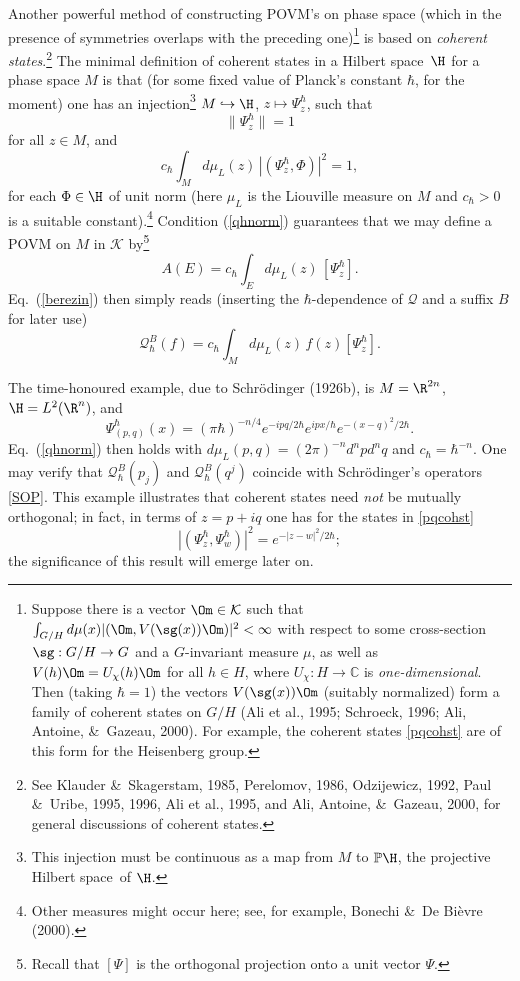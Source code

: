 \documentclass[12pt,titlepage]{article}
\newcommand{\beq}{\begin{equation}}
\newcommand{\eeq}{\end{equation}}
\newcommand{\Hs}{Hilbert space} \newcommand{\Bs}{Banach space}
\newcommand{\raw}{\rightarrow} \newcommand{\rat}{\mapsto}
\newcommand{\hraw}{\hookrightarrow} \newcommand{\Law}{\Leftarrow}
\newcommand{\qh}{q_{\hbar}} \newcommand{\sgh}{\sigma_{\hbar}}
\newcommand{\er}{\eqref}
\newcommand{\ch}{\chi} \newcommand{\ps}{\psi} \newcommand{\Ps}{\Psi}
\newcommand{\CK}{{\mathcal K}}   \newcommand{\CL}{{\mathcal L}}
\newcommand{\CQ}{{\mathcal Q}} \newcommand{\CR}{{\mathcal R}}
\renewcommand{\C}{{\mathbb C}} \newcommand{\D}{{\mathbb D}}
\renewcommand{\qh}{\CQ_{\hbar}}
\begin{document}
Another powerful method of constructing POVM's on phase space (which in the presence of symmetries overlaps with the preceding one)\footnote{
Suppose there is a vector $\Om\in\CK$ such that
$\int_{G/H}d\mu(x) |(\Om, V(\sg(x))\Om)|^2 <\infty$
with respect to some cross-section $\sg: G/H\raw G$ and a
$G$-invariant measure $\mu$, as well as $V(h)\Om=U_{\ch}(h)\Om$ for all $h\in H$, where $U_{\ch}:H\raw \C$ is {\it one-dimensional}. Then (taking $\hbar=1$)
the vectors $V(\sg(x))\Om$ (suitably normalized) form a family of coherent states on $G/H$ (Ali et al., 1995; Schroeck, 1996;  Ali,  Antoine,  \&\ Gazeau, 2000). For example, the coherent states \er{pqcohst} are of this form for the Heisenberg group.}
 is based on {\it coherent states}.\footnote{\label{CSFNO}See  Klauder \&\  Skagerstam, 1985, 
Perelomov, 1986,   Odzijewicz, 1992, Paul \&\ Uribe, 1995, 1996, Ali et al., 1995,  and   Ali,  Antoine,  \&\ Gazeau, 2000, for  general discussions of coherent states. } The minimal definition of coherent states in a \Hs\ $\H$ for a phase space $M$ is that 
(for some fixed value of Planck's constant $\hbar$, for the moment)
one has an injection\footnote{This injection must be continuous as a map from $M$ to
$\mathbb{P}\H$, the projective \Hs\ of $\H$.}
 $M\hraw \H$, $z\mapsto\Psi_z^{\hbar}$, such that 
\beq \|\Psi_z^{\hbar}\|=1 \label{normcs}
\eeq
 for all $z\in M$, and 
\beq
 c_{\hbar} \int_M  d\mu_L(z)\,|(\Psi_z^{\hbar},\Phi)|^2 =1, \label{qhnorm}
\eeq
for each $\Phi\in\H$ of unit norm (here $\mu_L$ is the Liouville measure on
$M$ and $c_{\hbar}>0$ is a suitable constant).\footnote{Other measures might occur here; see, for example,   Bonechi \&\  De Bi\`{e}vre (2000).}
Condition (\ref{qhnorm}) guarantees that we may define a POVM on $M$ in $\CK$
by\footnote{Recall that $[\Psi]$ is the orthogonal projection onto a unit vector $\Psi$.}
\beq
A(E)= c_{\hbar} \int_E  d\mu_L(z)\,[\Psi_z^{\hbar}]. \label{pov}
\eeq
Eq.\  (\ref{berezin}) then simply reads (inserting the $\hbar$-dependence of $\CQ$ and a suffix $B$ for later use)
\beq
\qh^B(f)= c_{\hbar}\int_{M}  d\mu_L(z)\, f(z) [\Psi^{\hbar}_z].
\label{b2}
\eeq

The time-honoured example,
due to Schr\"{o}dinger (1926b), is $M=\R^{2n}$, $\H=L^2(\R^n)$, and 
\beq
\Psi_{(p,q)}^{\hbar}(x)=(\pi\hbar)^{-n/4}e^{-
ipq/2\hbar}e^{ipx/\hbar}e^{-(x-q)^2/2\hbar}.\label{pqcohst} 
\eeq
Eq.\ (\ref{qhnorm})  then holds with $d\mu_L(p,q)=(2\pi)^{-n}d^npd^nq$ and
$c_{\hbar}=\hbar^{-n}$. One may verify that $\qh^B(p_j)$ and $\qh^B(q^j)$ coincide with Schr\"{o}dinger's operators \er{SOP}.
This example illustrates that coherent states need {\it not} be mutually orthogonal; in fact, in terms of $z=p+iq$
one has for the states in \er{pqcohst} 
\beq
 |(\Psi^{\hbar}_{z},\Psi^{\hbar}_{w})|^2=e^{-|z-w|^2/2\hbar}; \label{tpbt}
\eeq
the significance of this result will emerge later on.
\end{document}
